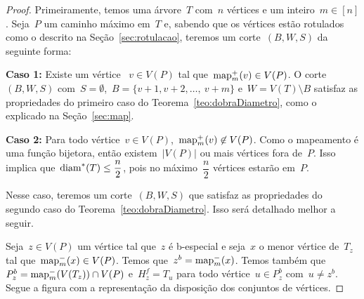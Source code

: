 		\begin{proof}
		Primeiramente, temos uma árvore~$T$ com~${n}$ vértices e um 
		inteiro~${m\in[n]}$.
		Seja~$P$ um caminho máximo em~$T$ e, sabendo que os vértices
		estão rotulados como o descrito na Seção~\ref{sec:rotulacao},
		teremos um corte~$(B,W,S)$ da seguinte forma:
		\bigskip
		\bigskip

		\textbf{Caso 1:}
			Existe um vértice ~${v\in V(P)}$ tal 
			que~${\mathrm{map}_m^+(v)\in V(P)}$. O 
			corte~$(B,W,S)$ 
			com~${S=\emptyset}$,~${B =\{v+1, v+2,\ldots,~v+m\}}$
			e~${W=V(T)\setminus B}$ satisfaz as propriedades do
			primeiro caso do Teorema~\ref{teo:dobraDiametro},
			como o explicado na Seção~\ref{sec:map}.

	\bigskip
	\bigskip

		\textbf{Caso 2:}
			Para todo vértice~${v\in V(P)}$,~${\mathrm{map}_m^+(v)\not\in V(P)}$.
			Como o mapeamento é uma função bijetora, 
			então existem~$|V(P)|$ ou mais vértices fora de~$P$.
			Isso implica que~$\mathrm{diam}^*(T)\le\dfrac{n}{2}$, pois no 
			máximo~$\dfrac{n}{2}$ vértices estarão em~$P$.

			Nesse caso, teremos um corte~$(B,W,S)$ que satisfaz as
			propriedades do segundo caso do Teorema~\ref{teo:dobraDiametro}.
			Isso será detalhado melhor a seguir.

			\bigskip
			

			Seja~${z\in V(P)}$ um vértice tal que~$z$ é b-especial 
			e seja~$x$ o menor vértice de~$T_z$ tal 
			que~${\mathrm{map}^-_m(x)\in V(P)}$. Temos 
			que~${z^b = \mathrm{map}^-_m(x)}$.
			Temos também
			que~${P_z^b = \mathrm{map}^-_m(V(T_z))\cap V(P)}$
			e~${H_z^f =T_u}$ para todo 
			vértice~${u\in P_z^b}$ com~${u\ne z^b}$.
			Segue a figura com a representação da disposição dos 
			conjuntos de vértices.


\end{proof}
